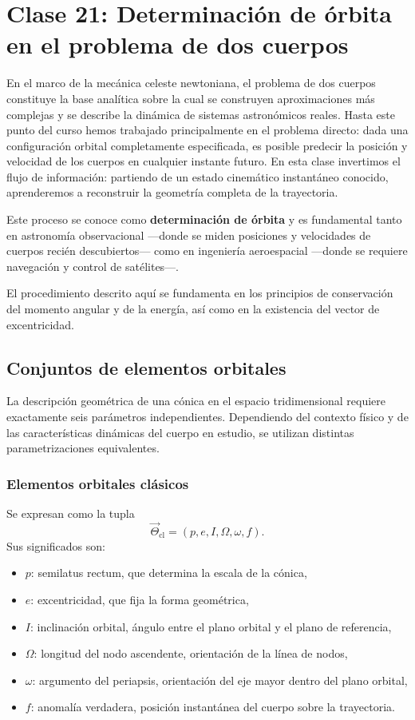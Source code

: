 \chapter{Clase 21: Determinación de órbita en el problema de dos cuerpos}

En el marco de la mecánica celeste newtoniana, el problema de dos cuerpos constituye la base analítica sobre la cual se construyen aproximaciones más complejas y se describe la dinámica de sistemas astronómicos reales. Hasta este punto del curso hemos trabajado principalmente en el problema directo: dada una configuración orbital completamente especificada, es posible predecir la posición y velocidad de los cuerpos en cualquier instante futuro. En esta clase invertimos el flujo de información: partiendo de un estado cinemático instantáneo conocido, aprenderemos a reconstruir la geometría completa de la trayectoria.

Este proceso se conoce como \textbf{determinación de órbita} y es fundamental tanto en astronomía observacional —donde se miden posiciones y velocidades de cuerpos recién descubiertos— como en ingeniería aeroespacial —donde se requiere navegación y control de satélites—.

El procedimiento descrito aquí se fundamenta en los principios de conservación del momento angular y de la energía, así como en la existencia del vector de excentricidad.

\section{Conjuntos de elementos orbitales}
La descripción geométrica de una cónica en el espacio tridimensional requiere exactamente seis parámetros independientes. Dependiendo del contexto físico y de las características dinámicas del cuerpo en estudio, se utilizan distintas parametrizaciones equivalentes.

\subsection{Elementos orbitales clásicos}
Se expresan como la tupla
\[
\vec{\Theta}_{\mathrm{cl}} = (p, e, I, \Omega, \omega, f).
\]
Sus significados son:
\begin{itemize}
    \item \(p\): semilatus rectum, que determina la escala de la cónica,
    \item \(e\): excentricidad, que fija la forma geométrica,
    \item \(I\): inclinación orbital, ángulo entre el plano orbital y el plano de referencia,
    \item \(\Omega\): longitud del nodo ascendente, orientación de la línea de nodos,
    \item \(\omega\): argumento del periapsis, orientación del eje mayor dentro del plano orbital,
    \item \(f\): anomalía verdadera, posición instantánea del cuerpo sobre la trayectoria.
\end{itemize}

